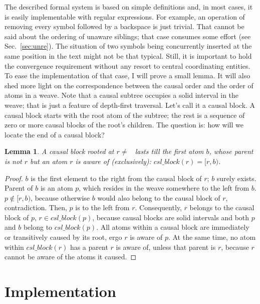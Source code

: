 \documentclass{sig-alternate}
\newtheorem{lemma}{Lemma}
\newcommand{\tighten}{\setlength{\itemsep}{1pt}\setlength{\parskip}{0pt}\setlength{\parsep}{0pt}}
\begin{document}
The described formal system is based on simple definitions and, in most cases, it is easily implementable with regular expressions.
For example, an operation of removing every symbol followed by a backspace is just trivial.
That cannot be said about the ordering of unaware siblings; that case consumes some effort (see Sec.~\ref{sec:unre}).
The situation of two symbols being concurrently inserted at the same position in the text might not be that typical.
Still, it is important to hold the convergence requirement without any resort to central coordinating entities. 
To ease the implementation of that case, I will prove a small lemma.
It will also shed more light on the correspondence between the causal order and the order of atoms in a weave. 
Note that a causal subtree occupies a solid interval in the weave; that is just a feature of depth-first traversal.
Let's call it a causal block.
A causal block starts with the root atom of the subtree; the rest is a sequence of zero or more causal blocks of the root's children.
The question is: how will we locate the end of a causal block?
\begin{lemma}\tighten A causal block rooted at $r \ne$ \aum ~lasts till
the first atom $b$, whose parent is not $r$ but an atom
$r$ is aware of (exclusively):  $csl\_block(r) = [r,b)$. \label{lemma:1}
\end{lemma} 
\begin{proof}\tighten
$b$ is the first element to the right from the causal
block of $r$; $b$ surely exists. Parent of $b$ is an atom $p$,
which resides in the weave somewhere to the left from $b$.
$p \notin [r,b)$, because otherwise $b$ would also belong
to the causal block of $r$, contradiction.
Then, $p$ is to the left from $r$. Consequently, $r$ belongs
to the causal block of $p$, $r \in csl\_block(p)$, because
causal blocks are solid intervals and both $p$ and $b$
belong to $csl\_block(p)$. All atoms within a causal block are
immediately or transitively caused by its root,
ergo $r$ is aware of $p$. At the same time, no atom
within $csl\_block(r)$ has a parent $r$ is aware of, unless
that parent is $r$, because $r$ cannot be aware of the
atoms it caused.
\end{proof}


\section{Implementation}	   \label{sec:algos}
\end{document}
